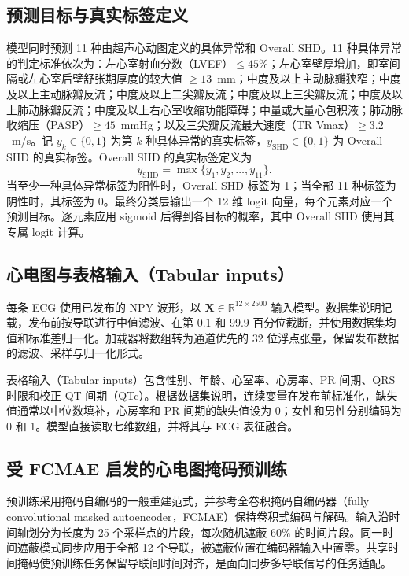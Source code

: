 \subsection{预测目标与真实标签定义}
\label{sec:outcomes}

模型同时预测 11 种由超声心动图定义的具体异常和 Overall SHD\cite{elias2026echonextdata}。11 种具体异常的判定标准依次为：左心室射血分数（LVEF）$\leq45\%$；左心室壁厚增加，即室间隔或左心室后壁舒张期厚度的较大值 $\geq13$~mm；中度及以上主动脉瓣狭窄；中度及以上主动脉瓣反流；中度及以上二尖瓣反流；中度及以上三尖瓣反流；中度及以上肺动脉瓣反流；中度及以上右心室收缩功能障碍；中量或大量心包积液；肺动脉收缩压（PASP）$\geq45$~mmHg；以及三尖瓣反流最大速度（TR Vmax）$\geq3.2$~m/s。记 $y_k\in\{0,1\}$ 为第 $k$ 种具体异常的真实标签，$y_{\mathrm{SHD}}\in\{0,1\}$ 为 Overall SHD 的真实标签。Overall SHD 的真实标签定义为
\begin{equation}
y_{\mathrm{SHD}}=\max\{y_1,y_2,\ldots,y_{11}\}.
\label{eq:overall_shd}
\end{equation}
当至少一种具体异常标签为阳性时，Overall SHD 标签为 1；当全部 11 种标签为阴性时，其标签为 0。最终分类层输出一个 12 维 logit 向量，每个元素对应一个预测目标。逐元素应用 sigmoid 后得到各目标的概率，其中 Overall SHD 使用其专属 logit 计算。

\subsection{心电图与表格输入（Tabular inputs）}
\label{sec:inputs}

每条 ECG 使用已发布的 NPY 波形，以 $\mathbf{X}\in\mathbb{R}^{12\times2500}$ 输入模型。数据集说明记载，发布前按导联进行中值滤波、在第 0.1 和 99.9 百分位截断，并使用数据集均值和标准差归一化。加载器将数组转为通道优先的 32 位浮点张量，保留发布数据的滤波、采样与归一化形式。

表格输入（Tabular inputs）包含性别、年龄、心室率、心房率、PR 间期、QRS 时限和校正 QT 间期（QTc）。根据数据集说明，连续变量在发布前标准化，缺失值通常以中位数填补，心房率和 PR 间期的缺失值设为 0；女性和男性分别编码为 0 和 1。模型直接读取七维数组，并将其与 ECG 表征融合。

\subsection{受 FCMAE 启发的心电图掩码预训练}
\label{sec:pretraining}

预训练采用掩码自编码的一般重建范式，并参考全卷积掩码自编码器（fully convolutional masked autoencoder，FCMAE）保持卷积式编码与解码\cite{he2022mae,woo2023convnextv2}。输入沿时间轴划分为长度为 25 个采样点的片段，每次随机遮蔽 $60\%$ 的时间片段。同一时间遮蔽模式同步应用于全部 12 个导联，被遮蔽位置在编码器输入中置零。共享时间掩码使预训练任务保留导联间时间对齐，是面向同步多导联信号的任务适配。

